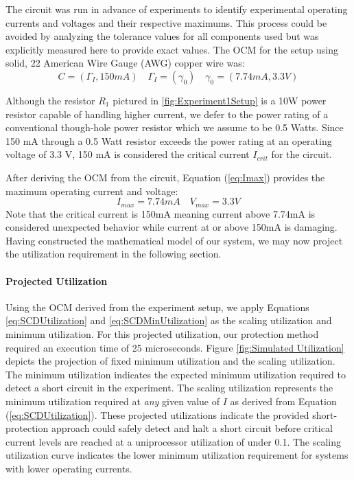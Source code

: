 The circuit was run in advance of experiments to identify experimental operating currents and voltages and their respective maximums.
This process could be avoided by analyzing the tolerance values for all components used but was explicitly measured here to provide exact values.
The OCM for the setup using solid, 22 American Wire Gauge (AWG) copper wire was:
\begin{equation}\label{eq:OCMSetup}
C = (\Gamma_{I}, 150mA) \quad \Gamma_{I} = (\gamma_{0}) \quad \gamma_{0} = (7.74mA, 3.3V) \nonumber
\end{equation}

Although the resistor $R_{1}$ pictured in \ref{fig:Experiment1Setup} is a 10W power resistor capable of handling higher current, we defer to the power rating of a conventional though-hole power resistor which we assume to be 0.5 Watts.
Since 150 mA through a 0.5 Watt resistor exceeds the power rating at an operating voltage of 3.3 V, 150 mA is considered the critical current $I_{crit}$ for the circuit.

After deriving the OCM from the circuit, Equation (\ref{eq:Imax}) provides the maximum operating current and voltage:
\begin{equation}
I_{max} =  7.74mA \nonumber \quad V_{max} = 3.3V \nonumber
\end{equation}
Note that the critical current is 150mA meaning current above 7.74mA is considered unexpected behavior while current at or above 150mA is damaging.
Having constructed the mathematical model of our system, we may now project the utilization requirement in the following section.

\paragraph{Projected Utilization}
Using the OCM derived from the experiment setup, we apply Equations \ref{eq:SCDUtilization} and \ref{eq:SCDMinUtilization} as the scaling utilization and minimum utilization.
For this projected utilization, our protection method required an execution time of 25 microseconds.
Figure \ref{fig:Simulated Utilization} depicts the projection of fixed minimum utilization and the scaling utilization.
The minimum utilization indicates the expected minimum utilization required to detect a short circuit in the experiment.
The scaling utilization represents the minimum utilization required at \textit{any} given value of $I$ as derived from Equation (\ref{eq:SCDUtilization}).
These projected utilizations indicate the provided short-protection approach could safely detect and halt a short circuit before critical current levels are reached at a uniprocessor utilization of under 0.1.
The scaling utilization curve indicates the lower minimum utilization requirement for systems with lower operating currents.

